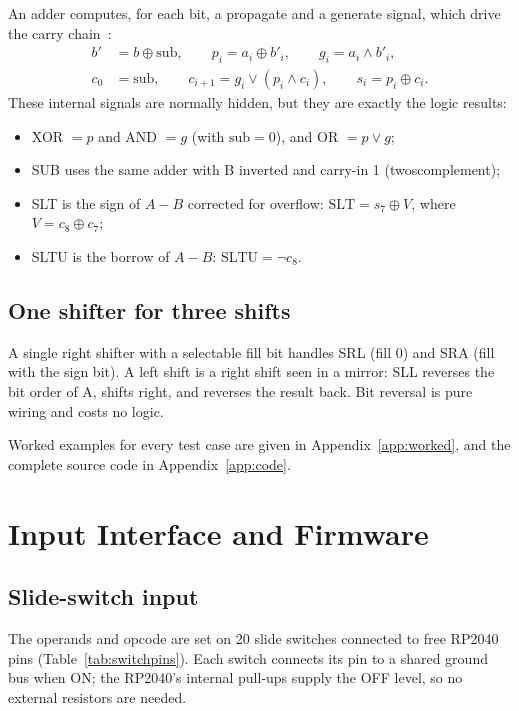 \documentclass[12pt,a4paper,twoside]{article}
\begin{document}
An adder computes, for each bit, a \gls{propagate} and a
\gls{generate} signal, which drive the carry
chain~\cite{harris}:
\begin{align}
  b' &= b \oplus \text{sub}, \qquad p_i = a_i \oplus b'_i, \qquad g_i = a_i \land b'_i,\\
  c_0 &= \text{sub}, \qquad c_{i+1} = g_i \lor (p_i \land c_i), \qquad
  s_i = p_i \oplus c_i .
\end{align}
These internal signals are normally hidden, but they are exactly the logic results:
\begin{itemize}
  \item XOR $= p$ and AND $= g$ (with $\text{sub}=0$), and OR $= p \lor g$;
  \item SUB uses the same adder with B inverted and carry-in 1
        (\gls{twoscomplement});
  \item SLT is the sign of $A - B$ corrected for overflow: $\text{SLT} = s_7 \oplus V$,
        where $V = c_8 \oplus c_7$;
  \item SLTU is the borrow of $A - B$: $\text{SLTU} = \lnot c_8$.
\end{itemize}

\subsection{One shifter for three shifts}

A single right shifter with a selectable fill bit handles SRL
(fill 0) and SRA (fill with the sign bit). A left shift is a right shift seen in a
mirror: SLL reverses the bit order of A, shifts right, and reverses the result
back. Bit reversal is pure wiring and costs no logic.

Worked examples for every test case are given in Appendix~\ref{app:worked}, and the
complete source code in Appendix~\ref{app:code}.

\section{Input Interface and Firmware}

\subsection{Slide-switch input}

The operands and opcode are set on 20 slide switches connected
to free RP2040 pins (Table~\ref{tab:switchpins}). Each switch connects its pin to a
shared ground bus when ON; the RP2040's internal pull-ups supply the OFF level, so
no external resistors are needed.
\end{document}
